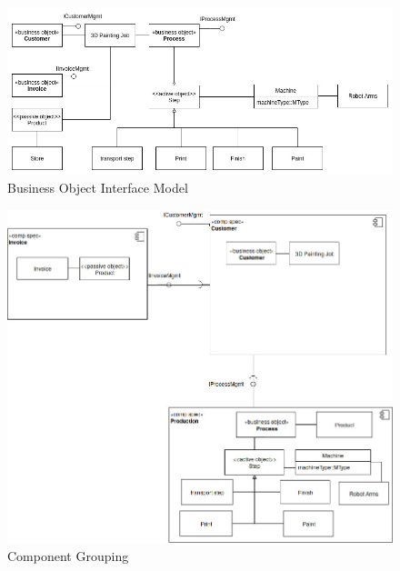 \documentclass[aspectratio=1610,onlymath]{beamer}
\begin{document}
\begin{frame}
\begin{figure}[ht]
\centering
\includegraphics[width=1\textwidth]{04_business-object-interface-model}
\caption{Business Object Interface Model}
\end{figure}
\end{frame}

\begin{frame}
\begin{figure}[ht]
\centering
\includegraphics[width=.65\textwidth]{05_component-grouping}
\caption{Component Grouping}
\end{figure}
\end{frame}
\end{document}
